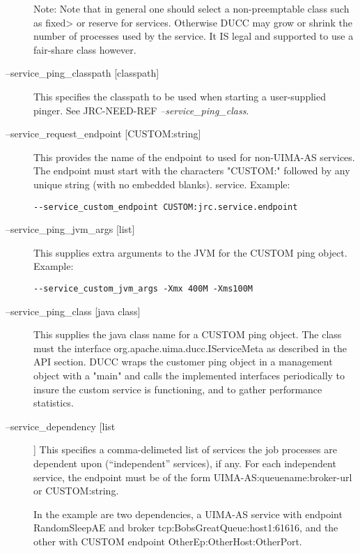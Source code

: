 \begin{description}
             Note: Note that in general one should select a non-preemptable class such as 
             fixed> or reserve for services. Otherwise DUCC may grow or shrink the number 
             of processes used by the service. It IS legal and supported to use a fair-share class 
             however. 

           \item[--service\_ping\_classpath {[classpath]}] This specifies the classpath to be used when
             starting a user-supplied pinger.  See JRC-NEED-REF {\em --service\_ping\_class}.

           \item[--service\_request\_endpoint {[CUSTOM:string]}] This provides the name of the endpoint
             to used for non-UIMA-AS services. The endpoint must start with the characters "CUSTOM:"
             followed by any unique string (with no embedded blanks).
             service. Example:
\begin{verbatim}
--service_custom_endpoint CUSTOM:jrc.service.endpoint 
\end{verbatim}
             
           \item[--service\_ping\_jvm\_args {[list]}] This supplies extra arguments to the JVM for the
             CUSTOM ping object. Example:
\begin{verbatim}
--service_custom_jvm_args -Xmx 400M -Xms100M 
\end{verbatim}
             
           \item[--service\_ping\_class {[java class]}] This supplies the java class name for a CUSTOM
             ping object. The class must the interface org.apache.uima.ducc.IServiceMeta as described in
             the API section. DUCC wraps the customer ping object in a management object with a "main"
             and calls the implemented interfaces periodically to insure the custom service is
             functioning, and to gather performance statistics. 
             
           \item[--service\_dependency {[list}]] This specifies a comma-delimeted list of services the
             job processes are dependent upon (``independent'' services), if any.  For each independent
             service, the endpoint must be of the form UIMA-AS:queuename:broker-url or CUSTOM:string.
             
             In the example are two dependencies, a UIMA-AS service with endpoint RandomSleepAE and broker
             tcp:BobsGreatQueue:host1:61616, and the other with CUSTOM endpoint
             OtherEp:OtherHost:OtherPort.
             

\end{description}
